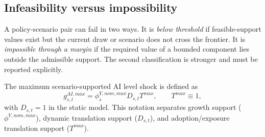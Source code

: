 \documentclass[11pt,a4paper]{article}
\begin{document}
\subsection{Infeasibility versus impossibility}\label{subsec:infeasibility_impossibility}

A policy-scenario pair can fail in two ways. It is \emph{below threshold} if feasible-support values exist but the current draw or scenario does not cross the frontier. It is \emph{impossible through a margin} if the required value of a bounded component lies outside the admissible support. The second classification is stronger and must be reported explicitly.

The maximum scenario-supported AI level shock is defined as
\begin{equation}
    g^{AI,max}_{s,t}=\phi^{Y,nom,max}_sD_{s,t}T^{max},\qquad T^{max}\equiv1,
\end{equation}
with $D_{s,t}=1$ in the static model. This notation separates growth support ($\phi^{Y,nom,max}$), dynamic translation support ($D_{s,t}$), and adoption/exposure translation support ($T^{max}$).
\end{document}
